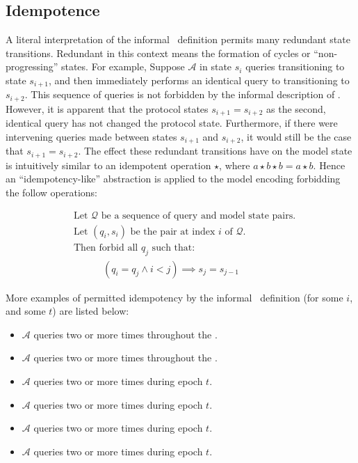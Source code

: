 \hypertarget{sec:idempotence}{%
\subsection{Idempotence}\label{sec:idempotence}}

A literal interpretation of the informal \CGKAsec\ definition permits many redundant state transitions.
Redundant in this context means the formation of cycles or ``non-progressing'' states.
For example, Suppose \(\mathcal{A}\) in state \(s_i\) queries  transitioning to state \(s_{i+1}\), and then immediately performs an identical query to  transitioning to \(s_{i+2}\).
This sequence of queries is not forbidden by the informal description of \CGKAsec.
However, it is apparent that the protocol states \(s_{i+1} = s_{i+2}\) as the second, identical query has not changed the protocol state.
Furthermore, if there were intervening queries made between states \(s_{i+1}\) and \(s_{i+2}\), it would still be the case that \(s_{i+1} = s_{i+2}\).
The effect these redundant transitions have on the model state is intuitively similar to an idempotent operation \(\star\), where \(a \star b \star b = a \star b\).
Hence an ``idempotency-like'' abstraction is applied to the model encoding forbidding the follow operations:

\begin{equation} \label{eq:7}
  \begin{split}
&\text{Let } \mathcal{Q} \text{ be a sequence of query and model state pairs.}\\
&\text{Let } (q_i, s_i) \text{ be the pair at index } i \text{ of } \mathcal{Q}.\\
&\text{Then forbid all } q_j \text{ such that:}\\
&\quad\quad\quad  (q_i = q_j \land i < j) \implies s_j = s_{j-1}
\end{split}
\end{equation}

More examples of permitted idempotency by the informal \CGKAsec\ definition (for some \(i\), and some \(t\)) are listed below:

\begin{itemize}
  \item \(\mathcal{A}\) queries          two or more times throughout the \CGKAsec.  
  \item \(\mathcal{A}\) queries       two or more times throughout the \CGKAsec.
  \item \(\mathcal{A}\) queries         two or more times during epoch \(t\).
  \item \(\mathcal{A}\) queries     two or more times during epoch \(t\).
  \item \(\mathcal{A}\) queries  two or more times during epoch \(t\).
  \item \(\mathcal{A}\) queries  two or more times during epoch \(t\).
\end{itemize}

